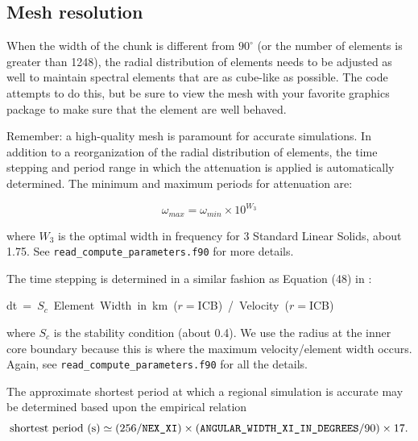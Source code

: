 \subsection{Mesh resolution}\label{sec:Mesh-resolution}

When the width of the chunk is different from $90^{\circ}$ (or the
number of elements is greater than 1248), the radial distribution
of elements needs to be adjusted as well to maintain spectral elements
that are as cube-like as possible. The code attempts to do this, but
be sure to view the mesh with your favorite graphics package to make
sure that the element are well behaved.\newline


Remember: a high-quality mesh is paramount for accurate simulations.
In addition to a reorganization of the radial distribution of elements,
the time stepping and period range in which the attenuation is applied
is automatically determined. The minimum and maximum periods for attenuation
are:

\[
\omega_{max}=\omega_{min}\times10^{W_{3}}\]


\noindent where $W_{3}$ is the optimal width in frequency for 3 Standard
Linear Solids, about 1.75. See \texttt{\small read\_compute\_parameters.f90}
for more details.

The time stepping is determined in a similar fashion as Equation (48)
in \citet{KoTr02a}:

\begin{lyxcode}
dt~=~$S_{c}$~Element~Width~in~km~($r=$ICB)~/~Velocity~($r=$ICB)
\end{lyxcode}
where $S_{c}$ is the stability condition (about 0.4). We use the
radius at the inner core boundary because this is where the maximum
velocity/element width occurs. Again, see \texttt{\small read\_compute\_parameters}\texttt{.f90}
for all the details.

The approximate shortest period at which a regional simulation is
accurate may be determined based upon the empirical relation
\begin{equation}
\mbox{shortest period (s)}\simeq(256/\mbox{\texttt{NEX\_XI}})\times(\texttt{ANGULAR\_WIDTH\_XI\_IN\_DEGREES}/90)\times17.\label{eq:shortest_period_regional}\end{equation}



